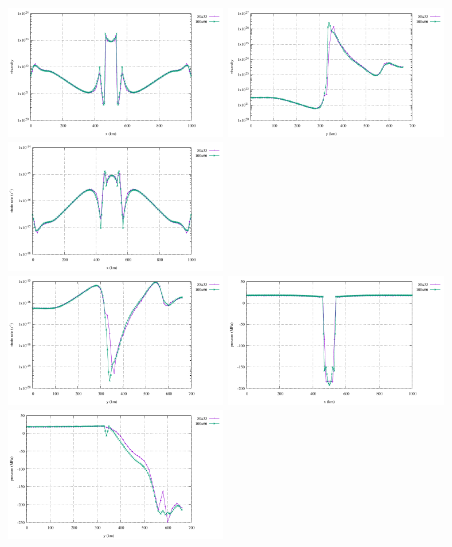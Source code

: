 \begin{center}
\includegraphics[width=5.7cm]{python_codes/fieldstone_87/results/experiment_04/horizontal_profile_eta.pdf}
\includegraphics[width=5.7cm]{python_codes/fieldstone_87/results/experiment_04/vertical_profile_eta.pdf}
\includegraphics[width=5.7cm]{python_codes/fieldstone_87/results/experiment_04/horizontal_profile_srn.pdf}\\
\includegraphics[width=5.7cm]{python_codes/fieldstone_87/results/experiment_04/vertical_profile_srn.pdf}
\includegraphics[width=5.7cm]{python_codes/fieldstone_87/results/experiment_04/horizontal_profile_p.pdf}
\includegraphics[width=5.7cm]{python_codes/fieldstone_87/results/experiment_04/vertical_profile_p.pdf}
\end{center}


